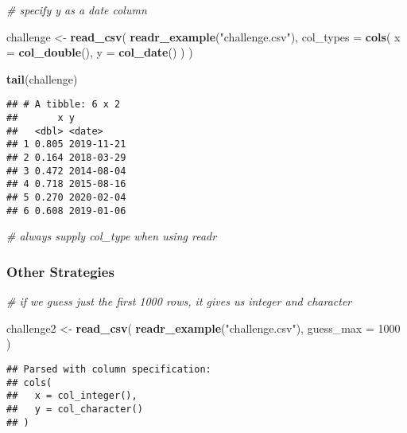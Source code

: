 \documentclass[]{article}
\newenvironment{Shaded}{\begin{snugshade}}{\end{snugshade}}
\newcommand{\KeywordTok}[1]{\textcolor[rgb]{0.13,0.29,0.53}{\textbf{#1}}}
\newcommand{\DataTypeTok}[1]{\textcolor[rgb]{0.13,0.29,0.53}{#1}}
\newcommand{\DecValTok}[1]{\textcolor[rgb]{0.00,0.00,0.81}{#1}}
\newcommand{\StringTok}[1]{\textcolor[rgb]{0.31,0.60,0.02}{#1}}
\newcommand{\CommentTok}[1]{\textcolor[rgb]{0.56,0.35,0.01}{\textit{#1}}}
\newcommand{\NormalTok}[1]{#1}
\begin{document}
\begin{Shaded}
\begin{Highlighting}[]
\CommentTok{# specify y as a date column}

\NormalTok{challenge <-}\StringTok{ }\KeywordTok{read_csv}\NormalTok{(}
  \KeywordTok{readr_example}\NormalTok{(}\StringTok{"challenge.csv"}\NormalTok{), }
  \DataTypeTok{col_types =} \KeywordTok{cols}\NormalTok{(}
    \DataTypeTok{x =} \KeywordTok{col_double}\NormalTok{(),}
    \DataTypeTok{y =} \KeywordTok{col_date}\NormalTok{()}
\NormalTok{  )}
\NormalTok{)}

\KeywordTok{tail}\NormalTok{(challenge)}
\end{Highlighting}
\end{Shaded}

\begin{verbatim}
## # A tibble: 6 x 2
##       x y         
##   <dbl> <date>    
## 1 0.805 2019-11-21
## 2 0.164 2018-03-29
## 3 0.472 2014-08-04
## 4 0.718 2015-08-16
## 5 0.270 2020-02-04
## 6 0.608 2019-01-06
\end{verbatim}

\begin{Shaded}
\begin{Highlighting}[]
\CommentTok{# always supply col_type when using readr}
\end{Highlighting}
\end{Shaded}

\subsubsection{Other Strategies}\label{other-strategies}

\begin{Shaded}
\begin{Highlighting}[]
\CommentTok{# if we guess just the first 1000 rows, it gives us integer and character}

\NormalTok{challenge2 <-}\StringTok{ }\KeywordTok{read_csv}\NormalTok{(}
  \KeywordTok{readr_example}\NormalTok{(}\StringTok{"challenge.csv"}\NormalTok{), }
  \DataTypeTok{guess_max =} \DecValTok{1000}
\NormalTok{)}
\end{Highlighting}
\end{Shaded}

\begin{verbatim}
## Parsed with column specification:
## cols(
##   x = col_integer(),
##   y = col_character()
## )
\end{verbatim}
\end{document}
